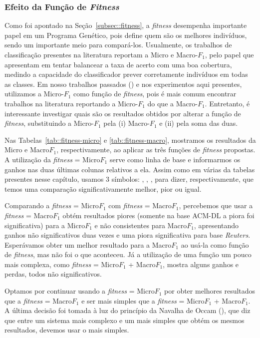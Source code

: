 \subsubsection{Efeito da Função de \textit{Fitness}}
\label{sec::fitness}


Como foi apontado na Seção~\ref{subsec::fitness}, a \textit{fitness} desempenha importante papel em um Programa Genético, pois define quem são os melhores indivíduos, sendo um importante meio para compará-los.
Usualmente, os trabalhos de classificação presentes na literatura reportam a Micro e Macro-$F_1$, pelo papel que apresentam em tentar balancear a taxa de acerto com uma boa cobertura, medindo a capacidade do classificador prever corretamente indivíduos em todas as classes.
Em nosso trabalhos passados (\cite{Palotti10,Palotti11})
e nos experimentos aqui presentes, utilizamos a Micro-$F_1$ como função de \textit{fitness}, pois é mais comum encontrar trabalhos na literatura reportando a Micro-$F_1$ do que a Macro-$F_1$. Entretanto, é interessante investigar quais são os resultados obtidos por alterar a função de \textit{fitness}, substituindo a Micro-$F_1$ pela (i) Macro-$F_1$ e (ii) pela soma das duas.

Nas Tabelas~\ref{tab::fitness-micro} e \ref{tab::fitness-macro}, mostramos os resultados da Micro e Macro$F_1$, respectivamente, ao aplicar as três funções de \textit{fitness} propostas.
A utilização da \textit{fitness} = Micro$F_1$ serve como linha de base e informarmos os ganhos nas duas últimas colunas relativos a ela. 
Assim como em várias da tabelas presentes nesse capítulo, usamos 3 símbolos: \triangOK, \triangBAD, \ball, para dizer, respectivamente, que temos uma comparação significativamente melhor, pior ou igual.  



Comparando a \textit{fitness} = Micro$F_1$ com \textit{fitness} = Macro$F_1$, percebemos que usar a \textit{fitness} = Macro$F_1$ obtém resultados piores (somente na base \textsc{ACM-DL} a piora foi significativa) para a Micro$F_1$ e não consistentes para Macro$F_1$, apresentando ganhos não significativos duas vezes e uma piora significativa para base \textit{Reuters}. Esperávamos obter um melhor resultado para a Macro$F_1$ ao usá-la como função de \textit{fitness}, mas não foi o que aconteceu.
Já a utilização de uma função um pouco mais complexa, como \textit{fitness} = Micro$F_1$ + Macro$F_1$, mostra alguns ganhos e perdas, todos não significativos. 

Optamos por continuar usando a \textit{fitness} = Micro$F_1$ 
por obter melhores resultados que a \textit{fitness} = Macro$F_1$ e
ser mais simples que a \textit{fitness} = Micro$F_1$ + Macro$F_1$. A última decisão foi tomada à luz do princípio da Navalha de Occam (\cite{Blumer87}), que diz que entre um sistema mais complexo e um mais simples que obtém os mesmos resultados, devemos usar o mais simples.


